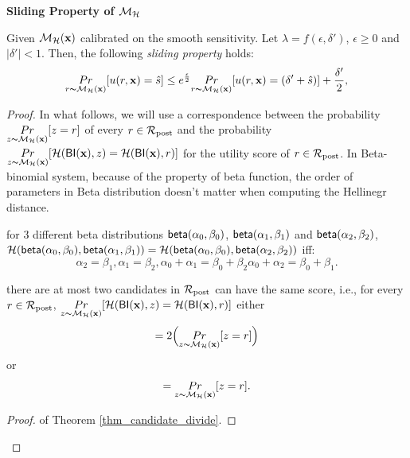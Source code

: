 \documentclass{article}
\begin{document}
\noindent \textbf{Sliding Property of $\mathcal{M}_{\mathcal{H}}$}
\begin{lem}
\label{lem_sliding}
Given $\mathcal{M}_{\mathcal{H}}(\textbf{x})$ calibrated on the smooth sensitivity. Let $\lambda = f(\epsilon,
\delta')$, $\epsilon\geq 0$ and $|\delta'| < 1$. Then, the following \emph{sliding property} holds:
\begin{equation*}
\underset{r \thicksim \mathcal{M}_{\mathcal{H}}(\textbf{x})}{Pr}[u(r,\textbf{x}) = \hat{s}]
\leq
e^{\frac{\epsilon}{2}} \underset{r \thicksim \mathcal{M}_{\mathcal{H}}(\textbf{x})}{Pr}[u(r,\textbf{x}) = (\delta' + \hat{s})] + \frac{\delta'}{2},
\end{equation*}

\end{lem}

\begin{proof}

In what follows, we will use a correspondence between the probability
 $\underset{z \thicksim \mathcal{M}_{\mathcal{H}}(\textbf{x})}{Pr}[z = r]$ of every
 $r\in\mathcal{R}_{\textup{post}}$ and the probability 
 $\underset{z \thicksim \mathcal{M}_{\mathcal{H}}(\textbf{x})}{Pr}[\mathcal{H}(\mathsf{BI}(\textbf{x}),z) =
 \mathcal{H}(\mathsf{BI}(\textbf{x}),r)]$ for the utility score of $r \in \mathcal{R}_{\textup{post}}$. In Beta-binomial system, because of the property of beta function, the order of parameters in Beta distribution doesn't matter when computing the Hellinegr distance. 

 \begin{thm}
 \label{thm_hellinegr_equality}
 for 3 different beta distributions $\mathsf{beta}(\alpha_0, \beta_0)$, $\mathsf{beta}(\alpha_1, \beta_1)$ and $\mathsf{beta}(\alpha_2, \beta_2)$, $\mathcal{H}(\mathsf{beta}(\alpha_0, \beta_0),\mathsf{beta}(\alpha_1, \beta_1)) = \mathcal{H}(\mathsf{beta}(\alpha_0, \beta_0),\mathsf{beta}(\alpha_2, \beta_2))$ iff:
  $$
  \alpha_2 = \beta_1, \alpha_1 = \beta_2, \alpha_0 + \alpha_1 = \beta_0 + \beta_2 \alpha_0 + \alpha_2 = \beta_0 + \beta_1.
  $$
 \end{thm}


 \begin{thm}
 \label{thm_candidate_divide}
 there are at most two candidates in $\mathcal{R}_{\textup{post}}$ can have the same score, i.e., for every $r \in \mathcal{R}_{\textup{post}}$, $\underset{z \thicksim \mathcal{M}_{\mathcal{H}}(\textbf{x})}{Pr}[\mathcal{H}(\mathsf{BI}(\textbf{x}),z) = \mathcal{H}(\mathsf{BI}(\textbf{x}),r)]$ either 
 $$
 = 2\Big ( \underset{z \thicksim \mathcal{M}_{\mathcal{H}}(\textbf{x})}{Pr}[z = r]\Big )
 $$ or 
 $$
 =\underset{z \thicksim \mathcal{M}_{\mathcal{H}}(\textbf{x})}{Pr}[z = r].
 $$
 \end{thm}
 \begin{proof} of Theorem \ref{thm_candidate_divide}.


\end{proof}
\end{proof}
\end{document}
